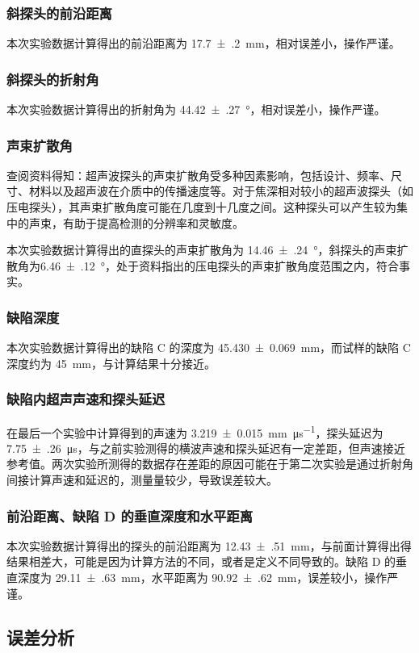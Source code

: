 \subsubsection{斜探头的前沿距离}
本次实验数据计算得出的前沿距离为 \SI{17.7(2)}{\mm}，相对误差小，操作严谨。
\subsubsection{斜探头的折射角}
本次实验数据计算得出的折射角为 \SI{44.42(27)}{\degree}，相对误差小，操作严谨。
\subsubsection{声束扩散角}
查阅资料得知：超声波探头的声束扩散角受多种因素影响，包括设计、频率、尺寸、材料以及超声波在介质中的传播速度等。对于焦深相对较小的超声波探头（如压电探头），其声束扩散角度可能在几度到十几度之间。这种探头可以产生较为集中的声束，有助于提高检测的分辨率和灵敏度。\par
本次实验数据计算得出的直探头的声束扩散角为 \SI{14.46(24)}{\degree}，斜探头的声束扩散角为\linebreak \SI{6.46(12)}{\degree}，处于资料指出的压电探头的声束扩散角度范围之内，符合事实。
\subsubsection{缺陷深度}
本次实验数据计算得出的缺陷 C 的深度为 \SI{45.430(69)}{\mm}，而试样的缺陷 C 深度约为 \SI{45}{\mm}，与计算结果十分接近。
\subsubsection{缺陷内超声声速和探头延迟}
在最后一个实验中计算得到的声速为 \SI{3.219(15)}{\mm\per\us}，探头延迟为 \SI{7.75(26)}{\us}，与之前实验测得的横波声速和探头延迟有一定差距，但声速接近参考值。两次实验所测得的数据存在差距的原因可能在于第二次实验是通过折射角间接计算声速和延迟的，测量量较少，导致误差较大。
\subsubsection{前沿距离、缺陷 D 的垂直深度和水平距离}
本次实验数据计算得出的探头的前沿距离为 \SI{12.43(51)}{\mm}，与前面计算得出得结果相差大，可能是因为计算方法的不同，或者是定义不同导致的。缺陷 D 的垂直深度为 \SI{29.11(63)}{\mm}，水平距离为 \SI{90.92(62)}{\mm}，误差较小，操作严谨。
\subsection{误差分析}
